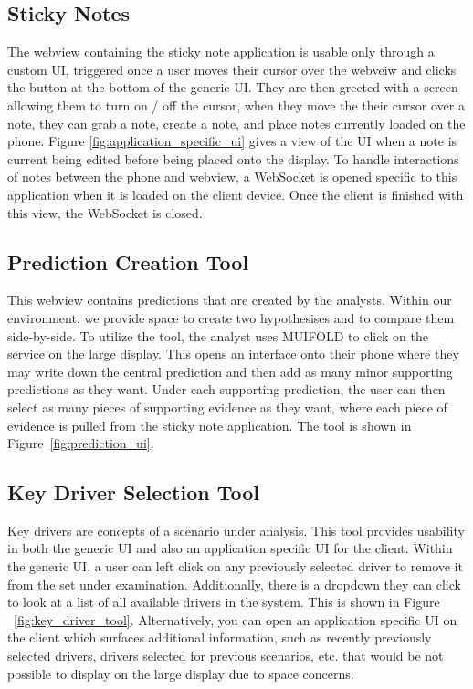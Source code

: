 \subsection{Sticky Notes}

The webview containing the sticky note application is usable only
through a custom UI, triggered once a user moves their cursor
over the webveiw and clicks the button at the bottom of the generic
UI. They are then greeted with a screen allowing them to turn on / off
the cursor, when they move the their cursor over a note, they can
grab a note, create a note, and place notes currently loaded on the
phone. Figure \ref{fig:application_specific_ui} gives a view of the
UI when a note is current being edited before being placed onto the
display. To handle interactions of notes between the phone and
webview, a WebSocket is opened specific to this application when
it is loaded on the client device. Once the client is finished with
this view, the WebSocket is closed.

\subsection{Prediction Creation Tool}

This webview contains predictions that are created by the analysts. Within our
environment, we provide space to create two hypothesises and to compare them
side-by-side. To utilize the tool, the analyst uses MUIFOLD to click on the
service on the large display. This opens an interface onto their phone where
they may write down the central prediction and then add as many minor supporting
predictions as they want. Under each supporting prediction, the user can then select
as many pieces of supporting evidence as they want, where each piece of evidence is
pulled from the sticky note application. The tool is shown in Figure~\ref{fig:prediction_ui}.

\subsection{Key Driver Selection Tool}

Key drivers are concepts of a scenario under analysis.
This tool provides usability in both the generic UI and also an
application specific UI for the client. Within the generic UI, a user
can left click on any previously selected driver to remove it
from the set under examination. Additionally, there is a dropdown
they can click to look at a list of all available drivers in the
system. This is shown in Figure ~\ref{fig:key_driver_tool}.
Alternatively, you can open an application specific UI on the client
which surfaces additional information, such as recently previously
selected drivers, drivers selected for previous scenarios, etc. that
would be not possible to display on the large display due to space
concerns.

